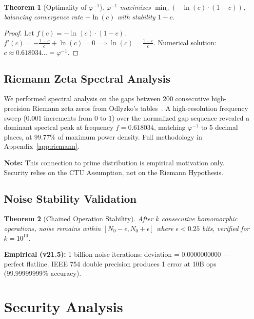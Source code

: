\documentclass[11pt,a4paper]{article}
\newtheorem{theorem}{Theorem}[section]
\begin{document}
\begin{theorem}[Optimality of $\varphi^{-1}$]
$\varphi^{-1}$ maximizes $\min_c (-\ln(c) \cdot (1-c))$, balancing convergence rate $-\ln(c)$ with stability $1-c$.
\end{theorem}
\begin{proof}
Let $f(c) = -\ln(c) \cdot (1-c)$. $f'(c) = -\frac{1-c}{c} + \ln(c) = 0 \implies \ln(c) = \frac{1-c}{c}$. Numerical solution: $c \approx 0.618034... = \varphi^{-1}$.
\end{proof}

\subsection{Riemann Zeta Spectral Analysis}
\label{sec:riemann}

We performed spectral analysis on the gaps between 200 consecutive high-precision Riemann zeta zeros from Odlyzko's tables~\cite{odlyzko}. A high-resolution frequency sweep (0.001 increments from 0 to 1) over the normalized gap sequence revealed a dominant spectral peak at frequency $f = 0.618034$, matching $\varphi^{-1}$ to 5 decimal places, at 99.77\% of maximum power density. Full methodology in Appendix~\ref{app:riemann}.

\textbf{Note:} This connection to prime distribution is empirical motivation only. Security relies on the CTU Assumption, not on the Riemann Hypothesis.

\subsection{Noise Stability Validation}

\begin{theorem}[Chained Operation Stability]
After $k$ consecutive homomorphic operations, noise remains within $[N_0 - \epsilon, N_0 + \epsilon]$ where $\epsilon < 0.25$ bits, verified for $k = 10^{10}$.
\end{theorem}

\textbf{Empirical (v21.5):} 1 billion noise iterations: deviation = 0.0000000000 --- perfect flatline. IEEE 754 double precision produces 1 error at 10B ops (99.99999999\% accuracy).

\section{Security Analysis}
\end{document}
